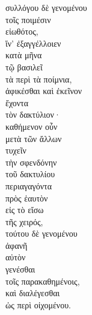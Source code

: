 {\large
\begin{greek}
\noindent συλλόγου δὲ γενομένου \\
\tabto{2em} τοῖς ποιμέσιν \\
εἰωθότος, \\
\tabto{2em} ἵν' ἐξαγγέλλοιεν \\
\tabto{4em} κατὰ μῆνα \\
\tabto{4em} τῷ βασιλεῖ \\
\tabto{2em} τὰ περὶ τὰ ποίμνια, \\
ἀφικέσθαι καὶ ἐκεῖνον \\
\tabto{2em} ἔχοντα \\
\tabto{4em} τὸν δακτύλιον· \\
καθήμενον οὖν \\
\tabto{2em} μετὰ τῶν ἄλλων \\
τυχεῖν \\
τὴν σφενδόνην \\
\tabto{2em} τοῦ δακτυλίου \\
περιαγαγόντα \\
\tabto{2em} πρὸς ἑαυτὸν \\
\tabto{2em} εἰς τὸ εἴσω \\
\tabto{4em} τῆς χειρός, \\
τούτου δὲ γενομένου\\
\tabto{2em} ἀφανῆ \\
\tabto{4em} αὐτὸν \\
\tabto{2em} γενέσθαι \\
\tabto{4em} τοῖς παρακαθημένοις, \\
\tabto{2em} καὶ διαλέγεσθαι\\
\tabto{4em} ὡς περὶ οἰχομένου. \\

\end{greek}
}

